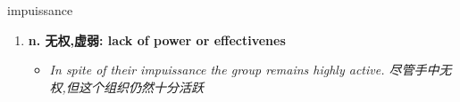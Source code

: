 
\begin{frame}
{\huge impuissance}
\begin{center}
\begin{enumerate}\Large
  \item \textbf{n. 无权,虚弱: lack of power or effectivenes}
  \begin{itemize}
    \item \em{\Large{In spite of their impuissance the group remains highly active. 尽管手中无权,但这个组织仍然十分活跃}}
  \end{itemize}
\end{enumerate}
\end{center}
\end{frame}

